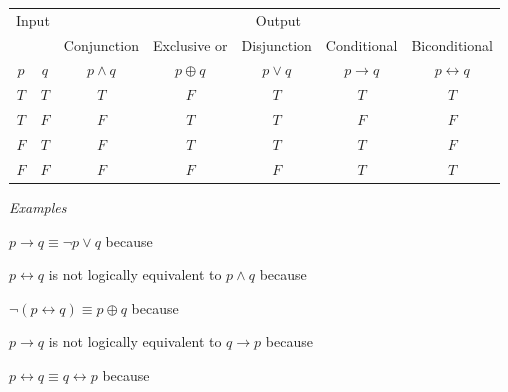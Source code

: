 
\begin{center}
    \begin{tabular}{cc||c|c|c|c|c}
    \multicolumn{2}{c||}{Input}  & \multicolumn{5}{c}{Output} \\
     & & Conjunction &  Exclusive or & Disjunction  &  Conditional & Biconditional  \\
    $p$ & $q$ & $p \wedge q$ &  $p  \oplus  q$ & $p \vee  q$ & $p \to q$ & $p \leftrightarrow q$\\
    \hline
    $T$ & $T$ & $T$ & $F$ & $T$ & $T$& $T$\\
    $T$ & $F$ & $F$ & $T$ & $T$ & $F$& $F$\\
    $F$ & $T$ & $F$ & $T$ & $T$ & $T$& $F$\\
    $F$ & $F$ & $F$ & $F$ & $F$ & $T$& $T$\\
    \end{tabular}
    \end{center}
    
    {\it Examples} 
    
    $p \to q \equiv \lnot p \lor q$ because \underline{\phantom{\hspace{4in}}} 
    
    \vfill
    
    $p \leftrightarrow q$ is not logically equivalent to $p \land q$ because \underline{\phantom{\hspace{4in}}} 
    
    \vfill
    
    $\lnot( p \leftrightarrow q) \equiv p \oplus q$ because \underline{\phantom{\hspace{4in}}} 
    
    \vfill
    
    
    $p \to q$ is not logically equivalent to $q \to p$ because \underline{\phantom{\hspace{4in}}} 
    
    \vfill
    
    $p \leftrightarrow q \equiv q \leftrightarrow p$ because \underline{\phantom{\hspace{4in}}} 
    
    \vfill